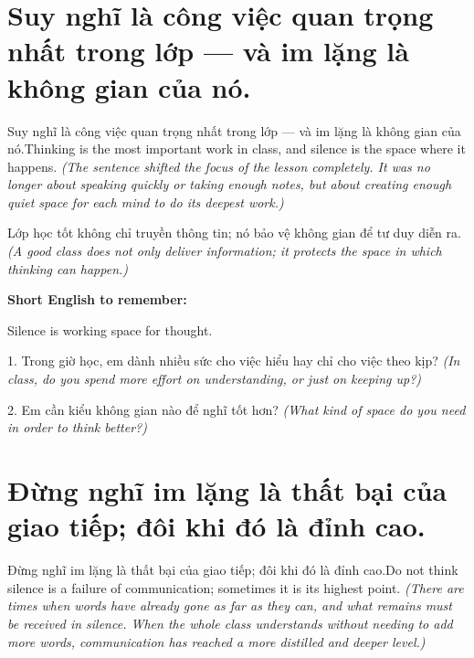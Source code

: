 \section{Suy nghĩ là công việc quan trọng nhất trong lớp — và im lặng là không gian của nó.}
\begin{truyen}{Suy nghĩ là công việc quan trọng nhất trong lớp — và im lặng là không gian của nó.}{Thinking is the most important work in class, and silence is the space where it happens.}
\textit{(The sentence shifted the focus of the lesson completely. It was no longer about speaking quickly or taking enough notes, but about creating enough quiet space for each mind to do its deepest work.)}
\end{truyen}

\begin{baihoc}
Lớp học tốt không chỉ truyền thông tin; nó bảo vệ không gian để tư duy diễn ra.
\textit{(A good class does not only deliver information; it protects the space in which thinking can happen.)}
\end{baihoc}

\begin{ghinhoanh}
\textbf{Short English to remember:}

Silence is working space for thought.

\end{ghinhoanh}

\begin{tuhocnhanh}
1. Trong giờ học, em dành nhiều sức cho việc hiểu hay chỉ cho việc theo kịp? \textit{(In class, do you spend more effort on understanding, or just on keeping up?)}

2. Em cần kiểu không gian nào để nghĩ tốt hơn? \textit{(What kind of space do you need in order to think better?)}
\end{tuhocnhanh}
\ngancach


\section{Đừng nghĩ im lặng là thất bại của giao tiếp; đôi khi đó là đỉnh cao.}
\begin{truyen}{Đừng nghĩ im lặng là thất bại của giao tiếp; đôi khi đó là đỉnh cao.}{Do not think silence is a failure of communication; sometimes it is its highest point.}
\textit{(There are times when words have already gone as far as they can, and what remains must be received in silence. When the whole class understands without needing to add more words, communication has reached a more distilled and deeper level.)}
\end{truyen}

